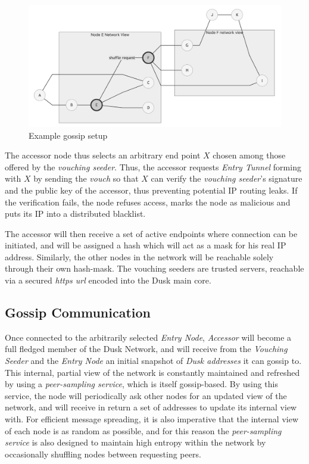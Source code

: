 \begin{figure}
\includegraphics[scale=0.25]{gossip1}
\caption{Example gossip setup}
\label{goss1}
\end{figure}


The accessor node thus selects an arbitrary end point \(X\) chosen among
those offered by the \emph{vouching seeder}. Thus, the accessor requests
\emph{Entry Tunnel} forming with \(X\) by sending the \emph{vouch} so
that \(X\) can verify the \emph{vouching seeder}'s signature and the
public key of the accessor, thus preventing potential IP routing leaks.
If the verification fails, the node refuses access, marks the node as
malicious and puts its IP into a distributed blacklist.

The accessor will then receive a set of active endpoints where
connection can be initiated, and will be assigned a hash which will act
as a mask for his real IP address. Similarly, the other nodes in the
network will be reachable solely through their own hash-mask. The
vouching seeders are trusted servers, reachable via a secured
\emph{https url} encoded into the \textrm{Dusk} main core.

\subsection{Gossip Communication}



Once connected to the arbitrarily selected \emph{Entry Node},
\emph{Accessor} will become a full fledged member of the \textrm{Dusk}
Network, and will receive from the \emph{Vouching Seeder} and the
\emph{Entry Node} an initial snapshot of \emph{\textrm{Dusk} addresses} it can
gossip to. This internal, partial view of the network is constantly
maintained and refreshed by using a \emph{peer-sampling service}, which
is itself gossip-based. By using this service, the node will
periodically ask other nodes for an updated view of the network, and
will receive in return a set of addresses to update its internal view
with. For efficient message spreading, it is also imperative that the
internal view of each node is as random as possible, and for this
reason the \emph{peer-sampling service} is also designed to maintain
high entropy within the network by occasionally shuffling nodes between
requesting peers.

